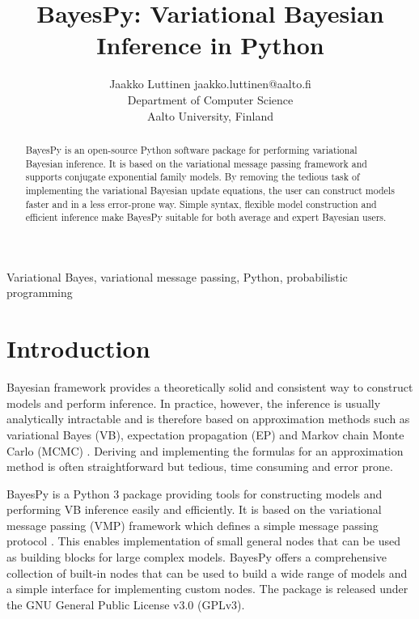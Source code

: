 \documentclass[twoside,11pt]{article}
\begin{document}
\title{BayesPy: Variational Bayesian Inference in Python}

\author{\name Jaakko Luttinen \email jaakko.luttinen@aalto.fi \\
       \addr Department of Computer Science\\
       Aalto University, Finland}


\maketitle

\begin{abstract}%
  BayesPy is an open-source Python software package for performing variational
  Bayesian inference.  It is based on the variational message passing framework
  and supports conjugate exponential family models.  By removing the tedious
  task of implementing the variational Bayesian update equations, the user can
  construct models faster and in a less error-prone way.  Simple syntax,
  flexible model construction and efficient inference make BayesPy suitable for
  both average and expert Bayesian users.
\end{abstract}

\begin{keywords}
  Variational Bayes, variational message passing, Python, probabilistic
  programming
\end{keywords}

\section{Introduction}

Bayesian framework provides a theoretically solid and consistent way to
construct models and perform inference.  In practice, however, the inference is
usually analytically intractable and is therefore based on approximation methods
such as variational Bayes (VB), expectation propagation (EP) and Markov chain
Monte Carlo (MCMC) \citep{Bishop:2006}.  Deriving and implementing the formulas
for an approximation method is often straightforward but tedious, time consuming
and error prone.


BayesPy is a Python 3 package providing tools for constructing models and
performing VB inference easily and efficiently.  It is based on the variational
message passing (VMP) framework which defines a simple message passing protocol
\citep{Winn:2005}.  This enables implementation of small general nodes that can
be used as building blocks for large complex models.  BayesPy offers a
comprehensive collection of built-in nodes that can be used to build a wide
range of models and a simple interface for implementing custom nodes.  The
package is released under the GNU General Public License v3.0 (GPLv3).
\end{document}
